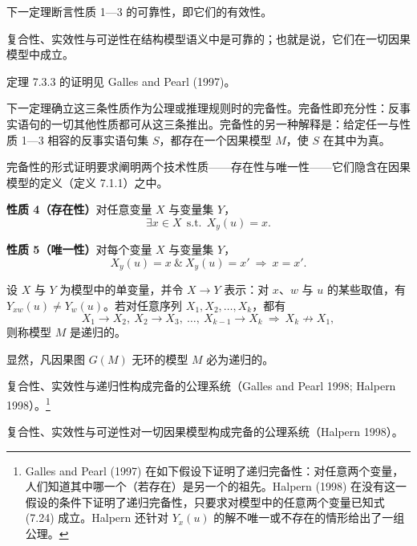 下一定理断言性质 1—3 的可靠性，即它们的有效性。

\begin{theorem}[可靠性]
复合性、实效性与可逆性在结构模型语义中是可靠的；也就是说，它们在一切因果模型中成立。
\end{theorem}

定理 7.3.3 的证明见 Galles and Pearl (1997)。

下一定理确立这三条性质作为公理或推理规则时的完备性。完备性即充分性：反事实语句的一切其他性质都可从这三条推出。完备性的另一种解释是：给定任一与性质 1—3 相容的反事实语句集 $S$，都存在一个因果模型 $M$，使 $S$ 在其中为真。

完备性的形式证明要求阐明两个技术性质——存在性与唯一性——它们隐含在因果模型的定义（定义 7.1.1）之中。

\medskip
\noindent\textbf{性质 4（存在性）}\quad 对任意变量 $X$ 与变量集 $Y$，
\begin{equation}
\exists x\in X\ \ \text{s.t.}\ \ X_y(u)=x. \tag{7.22}
\end{equation}

\medskip
\noindent\textbf{性质 5（唯一性）}\quad 对每个变量 $X$ 与变量集 $Y$，
\begin{equation}
X_y(u)=x\ \&\ X_y(u)=x'\ \Longrightarrow\ x=x'. \tag{7.23}
\end{equation}

\begin{definition}[递归性]
设 $X$ 与 $Y$ 为模型中的单变量，并令 $X\to Y$ 表示：对 $x$、$w$ 与 $u$ 的某些取值，有 $Y_{xw}(u)\ne Y_w(u)$。若对任意序列 $X_1,X_2,\dots,X_k$，都有
\begin{equation}
X_1\to X_2,\ X_2\to X_3,\ \dots,\ X_{k-1}\to X_k\ \Longrightarrow\ X_k\nrightarrow X_1, \tag{7.24}
\end{equation}
则称模型 $M$ 是递归的。
\end{definition}

显然，凡因果图 $G(M)$ 无环的模型 $M$ 必为递归的。

\begin{theorem}[递归完备性]
复合性、实效性与递归性构成完备的公理系统（Galles and Pearl 1998; Halpern 1998）。\footnote{Galles and Pearl (1997) 在如下假设下证明了递归完备性：对任意两个变量，人们知道其中哪一个（若存在）是另一个的祖先。Halpern (1998) 在没有这一假设的条件下证明了递归完备性，只要求对模型中的任意两个变量已知式 \textup{(7.24)} 成立。Halpern 还针对 $Y_x(u)$ 的解不唯一或不存在的情形给出了一组公理。}
\end{theorem}

\begin{theorem}[完备性]
复合性、实效性与可逆性对一切因果模型构成完备的公理系统（Halpern 1998）。
\end{theorem}

